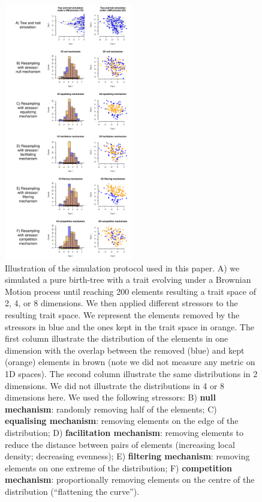 \documentclass[12pt,letterpaper]{article}
\begin{document}
\begin{figure}[!htbp]
\centering
   \includegraphics[width=0.5\textwidth]{Figures/simulation_protocol.pdf}
\caption{\scriptsize{Illustration of the simulation protocol used in this paper.
A) we simulated a pure birth-tree with a trait evolving under a Brownian Motion process until reaching 200 elements resulting a trait space of 2, 4, or 8 dimensions.
We then applied different stressors to the resulting trait space.
We represent the elements removed by the stressors in blue and the ones kept in the trait space in orange. The first column illustrate the distribution of the elements in one dimension with the overlap between the removed (blue) and kept (orange) elements in brown (note we did not measure any metric on 1D spaces). The second column illustrate the same distributions in 2 dimensions. We did not illustrate the distributions in 4 or 8 dimensions here.
We used the following stressors:
B) \textbf{null mechanism}: randomly removing half of the elements;
C) \textbf{equalising mechanism}: removing elements on the edge of the distribution;
D) \textbf{facilitation mechanism}: removing elements to reduce the distance between pairs of elements (increasing local density; decreasing evenness);
E) \textbf{filtering mechanism}: removing elements on one extreme of the distribution;
F) \textbf{competition mechanism}: proportionally removing elements on the centre of the distribution (``flattening the curve'').}}
\label{Fig:simulations}
\end{figure}
\bigskip
\end{document}
